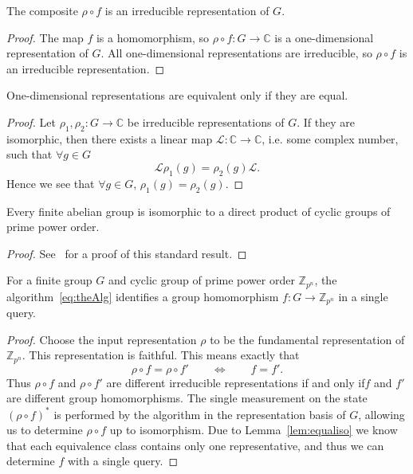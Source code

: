 \begin{lemma}\label{lem:irrep}
The composite $\rho\circ f$ is an irreducible representation of $G$.
\end{lemma}
\begin{proof}
The map $f$ is a homomorphism, so $\rho\circ f:G\to\mathbb{C}$ is a one-dimensional representation of $G$. All one-dimensional representations are irreducible, so $\rho\circ f$ is an irreducible representation.
\end{proof}


\begin{lemma}
\label{lem:equaliso}
One-dimensional representations are equivalent only if they are equal.
\end{lemma}
\begin{proof}
Let $\rho_1,\rho_2:G\to \mathbb{C}$ be irreducible representations of $G$. If they are isomorphic, then there exists a linear map $\mathcal{L}:\mathbb{C}\to\mathbb{C}$, i.e. some complex number, such that $\forall g\in G$
$$\mathcal{L}\rho_1(g) = \rho_2(g)\mathcal{L}.$$
Hence we see that $\forall g\in G$, $\rho_1(g) = \rho_2(g)$.
\end{proof}

\begin{theorem}
\label{thm:structure}
Every finite abelian group is isomorphic to a direct product of cyclic groups of prime power order.
\end{theorem}
\begin{proof}
See~\cite[Theorem 6.4]{artin-algebra} for a proof of this standard result.
\end{proof}

\begin{theorem}\label{rightCyclic}
For a finite group $G$ and cyclic group of prime power order $\mathbb{Z}_{p^n}$, the algorithm~\eqref{eq:theAlg} identifies a group homomorphism $f:G\to \mathbb{Z}_{p^n}$ in a single query.
\end{theorem}
\begin{proof}
Choose the input representation $\rho$ to be the fundamental representation of $\mathbb{Z}_{p^n}$. This representation is faithful.  This means exactly that 
\[ \rho\circ f = \rho\circ f' \qquad \Leftrightarrow \qquad f=f'. \]
Thus $\rho\circ f$ and $\rho\circ f'$ are different irreducible representations if and only if$f$ and $f'$ are different group homomorphisms.  The single measurement on the state $(\rho\circ f)^*$ is performed by the algorithm in the representation basis of $G$, allowing us to determine $\rho\circ f$ up to isomorphism. Due to Lemma~\ref{lem:equaliso} we know that each equivalence class contains only one representative, and thus we can determine $f$ with a single query.
\end{proof}

